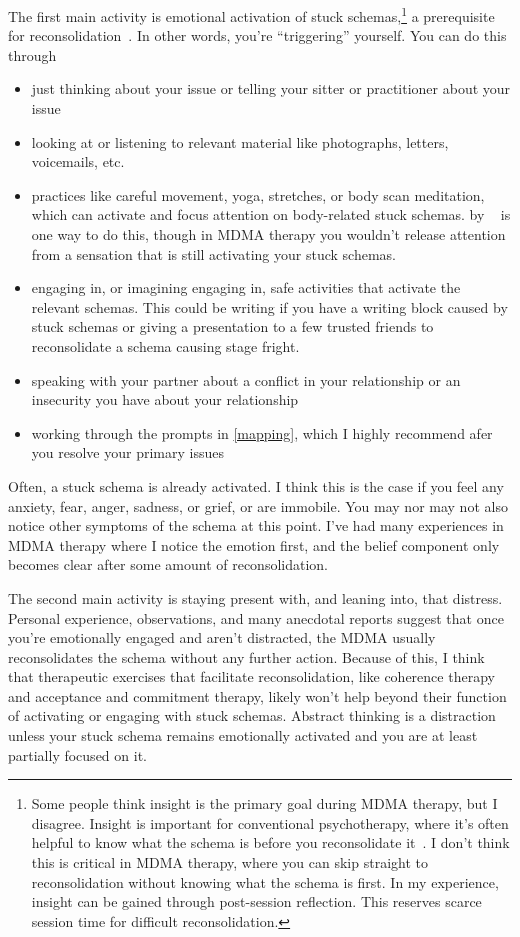 \documentclass[11pt,oneside]{book}
\let\cite\parencite
\newcommand{\prosecite}[1]{\citetitle{#1} by \citefullauthor{#1}~\cite{#1}}
\begin{document}
The first main activity is emotional activation of stuck schemas,\footnote{Some people think insight is the primary goal during MDMA therapy, but I disagree. Insight is important for conventional psychotherapy, where it's often helpful to know what the schema is before you reconsolidate it~\cite{eckerUnlocking}. I don't think this is critical in MDMA therapy, where you can skip straight to reconsolidation without knowing what the schema is first. In my experience, insight can be gained through post-session reflection. This reserves scarce session time for difficult reconsolidation.} a prerequisite for reconsolidation~\cite{eckerUnlocking}. In other words, you're \enquote{triggering} yourself. You can do this through
\begin{itemize}
    \item just thinking about your issue or telling your sitter or practitioner about your issue
    \item looking at or listening to relevant material like photographs, letters, voicemails, etc.
    \item practices like careful movement, yoga, stretches, or body scan meditation, which can activate and focus attention on body-related stuck schemas. \prosecite{bodyscan} is one way to do this, though in MDMA therapy you wouldn't release attention from a sensation that is still activating your stuck schemas.
    \item engaging in, or imagining engaging in, safe activities that activate the relevant schemas. This could be writing if you have a writing block caused by stuck schemas or giving a presentation to a few trusted friends to reconsolidate a schema causing stage fright.
    \item speaking with your partner about a conflict in your relationship or an insecurity you have about your relationship~\cite{colbertEvenings}
    \item working through the prompts in \cref{mapping}, which I highly recommend afer you resolve your primary issues
\end{itemize}

Often, a stuck schema is already activated. I think this is the case if you feel any anxiety, fear, anger, sadness, or grief, or are immobile. You may nor may not also notice other symptoms of the schema at this point. I've had many experiences in MDMA therapy where I notice the emotion first, and the belief component only becomes clear after some amount of reconsolidation.

The second main activity is staying present with, and leaning into, that distress. Personal experience, observations, and many anecdotal reports suggest that once you're emotionally engaged and aren't distracted, the MDMA usually reconsolidates the schema without any further action. Because of this, I think that therapeutic exercises that facilitate reconsolidation, like coherence therapy and acceptance and commitment therapy, likely won't help beyond their function of activating or engaging with stuck schemas. Abstract thinking is a distraction unless your stuck schema remains emotionally activated and you are at least partially focused on it.
\end{document}
